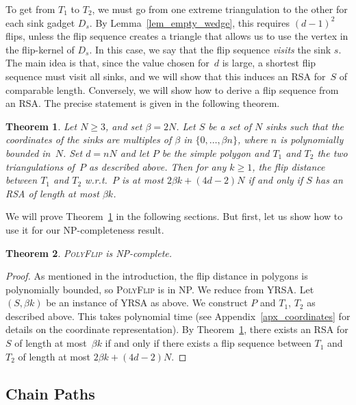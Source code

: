 \documentclass[a4paper,11pt]{article}
\newtheorem{theorem}{Theorem}[section]
\newcommand{\qedopt}{}
\begin{document}
To get from $T_1$ to $T_2$, we must go from one extreme
triangulation to the other for each sink gadget $D_s$. 
By Lemma~\ref{lem_empty_wedge},
this requires $(d-1)^2$ flips, unless the flip sequence creates a
triangle that allows us to use the vertex in the flip-kernel of
$D_s$. In this case, we say that the flip sequence \emph{visits}
the sink $s$.
The main idea is that, since the value chosen for~$d$ is large, a shortest flip sequence must visit all sinks, 
and we  will show that this induces an RSA for~$S$ of comparable length.
Conversely, we will show how to derive a flip sequence from an 
RSA.
The precise statement is given in the following theorem.

\begin{theorem}\label{thm:YRSA<->FlipDist}
Let $N \geq 3$, and
set $\beta = 2N$.
Let $S$ be a set of $N$ sinks such that
the coordinates of
the sinks are multiples of $\beta$ in $\{0, \dots, \beta n\}$, where $n$ is polynomially bounded in~$N$.
Set $d = nN$ and let $P$ be the simple polygon and $T_1$ and $T_2$
the two triangulations of~$P$ as described above.
Then for any $k \geq 1$, the flip distance between $T_1$ and
$T_2$ w.r.t.~$P$ is at most $2\beta k + (4d-2)N$ if and only
if
$S$ has an RSA of length at most $\beta k$.
\end{theorem}

We will prove Theorem~\ref{thm:YRSA<->FlipDist} in the following
sections. But first, let us show how to use it for our NP-completeness
result.
\begin{theorem}
\textup{\textsc{PolyFlip}} is \textup{NP}-complete.
\end{theorem}
\begin{proof}
As mentioned in the introduction, the flip distance in polygons is
polynomially bounded, so \textsc{PolyFlip} is in NP. 
We reduce from YRSA.
Let $(S,\beta k)$ be an instance of YRSA as above. 
We construct $P$ and $T_1$, $T_2$ as described above.
This takes polynomial time (see Appendix~\ref{apx_coordinates} for details on the coordinate representation).
By Theorem~\ref{thm:YRSA<->FlipDist}, 
there exists an RSA for $S$ of length at most~$\beta k$ if and only if there exists a flip sequence between $T_1$ and $T_2$ of length at most
$2\beta k + (4d-2)N$. 
\qedopt
\end{proof}



\subsection{Chain Paths}
\label{sec:triangulation_structure}
\end{document}

